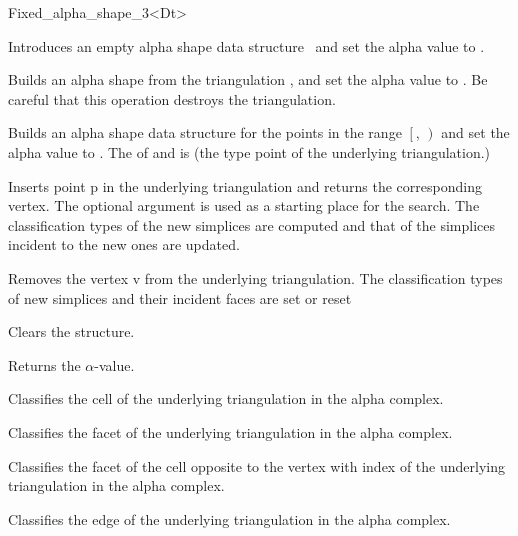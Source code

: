 \begin{ccRefClass} {Fixed_alpha_shape_3<Dt>}
\ccCreation
{}

{Introduces an empty alpha shape data structure
\ccVar\ and set the alpha value to .}

{Builds an alpha shape from the triangulation ,
and set the alpha value to .
Be careful that this operation destroys the triangulation.}

{Builds an alpha shape data structure
for the points in the range
$\left[\right.$, $\left.\right)$ and 
set the alpha value to .
\ccRequire The  of  and
 is  (the type point of the underlying 
triangulation.)}


\ccModifiers

{
Inserts point p in the underlying triangulation and returns the corresponding vertex.
The optional argument  is used as a starting place for the search.
The classification types of the new simplices are computed and that of the simplices incident 
to the new ones are updated.
}

{
Removes the vertex v from the underlying triangulation.
The classification types of new simplices and their incident faces are set or reset
}

{Clears the structure.}




{Returns the $\alpha$-value.}

{Classifies the cell  of the underlying triangulation in the alpha complex.}

{Classifies the facet  of the underlying triangulation in the alpha complex.}

{Classifies the facet of the cell  opposite to the vertex with index
 of the underlying triangulation in the alpha complex.}

{Classifies the edge  of the underlying triangulation in the alpha complex. }


\end{ccRefClass}
